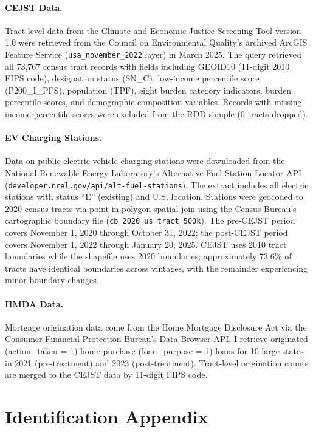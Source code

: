 \documentclass[12pt]{article}
\begin{document}
\paragraph{CEJST Data.} Tract-level data from the Climate and Economic Justice Screening Tool version 1.0 were retrieved from the Council on Environmental Quality's archived ArcGIS Feature Service (\texttt{usa\_november\_2022} layer) in March 2025. The query retrieved all 73,767 census tract records with fields including GEOID10 (11-digit 2010 FIPS code), designation status (SN\_C), low-income percentile score (P200\_I\_PFS), population (TPF), eight burden category indicators, burden percentile scores, and demographic composition variables. Records with missing income percentile scores were excluded from the RDD sample (0 tracts dropped).

\paragraph{EV Charging Stations.} Data on public electric vehicle charging stations were downloaded from the National Renewable Energy Laboratory's Alternative Fuel Station Locator API (\texttt{developer.nrel.gov/api/alt-fuel-stations}). The extract includes all electric stations with status ``E'' (existing) and U.S. location. Stations were geocoded to 2020 census tracts via point-in-polygon spatial join using the Census Bureau's cartographic boundary file (\texttt{cb\_2020\_us\_tract\_500k}). The pre-CEJST period covers November 1, 2020 through October 31, 2022; the post-CEJST period covers November 1, 2022 through January 20, 2025. CEJST uses 2010 tract boundaries while the shapefile uses 2020 boundaries; approximately 73.6\% of tracts have identical boundaries across vintages, with the remainder experiencing minor boundary changes.

\paragraph{HMDA Data.} Mortgage origination data come from the Home Mortgage Disclosure Act via the Consumer Financial Protection Bureau's Data Browser API. I retrieve originated (action\_taken = 1) home-purchase (loan\_purpose = 1) loans for 10 large states in 2021 (pre-treatment) and 2023 (post-treatment). Tract-level origination counts are merged to the CEJST data by 11-digit FIPS code.

\section{Identification Appendix}
\end{document}
